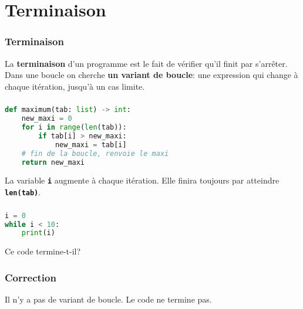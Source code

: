 \documentclass[svgnames,11pt]{beamer}
\begin{document}
\section{Terminaison}
\begin{frame}
    \frametitle{Terminaison}
    \begin{aretenir}[]
La \textbf{terminaison} d'un programme est le fait de vérifier qu'il finit par s'arrêter. Dans une boucle on cherche \textbf{un variant de boucle}: une expression qui change à chaque itération, jusqu'à un cas limite.
    \end{aretenir}

    

\end{frame}
\begin{frame}[fragile]
    \frametitle{}

    \begin{center}
        \begin{lstlisting}[language=Python , basicstyle=\ttfamily\small, xleftmargin=2em, xrightmargin=2em]
def maximum(tab: list) -> int:
    new_maxi = 0
    for i in range(len(tab)):
        if tab[i] > new_maxi:
            new_maxi = tab[i]
    # fin de la boucle, renvoie le maxi
    return new_maxi
\end{lstlisting}
        \label{CODE}
    \end{center}   
La variable \textbf{\texttt{i}} augmente à chaque itération. Elle finira toujours par atteindre \textbf{\texttt{len(tab)}}.
\end{frame}
\begin{frame}[fragile]
    \frametitle{}

    \begin{activite}
\begin{center}
\begin{lstlisting}[language=Python , basicstyle=\ttfamily\small, xleftmargin=2em, xrightmargin=2em]
i = 0
while i < 10:
    print(i)
\end{lstlisting}
\end{center}
Ce code termine-t-il?
    \end{activite}

\end{frame}
\begin{frame}
    \frametitle{Correction}

Il n'y a pas de variant de boucle. Le code ne termine pas.

\end{frame}
\end{document}
